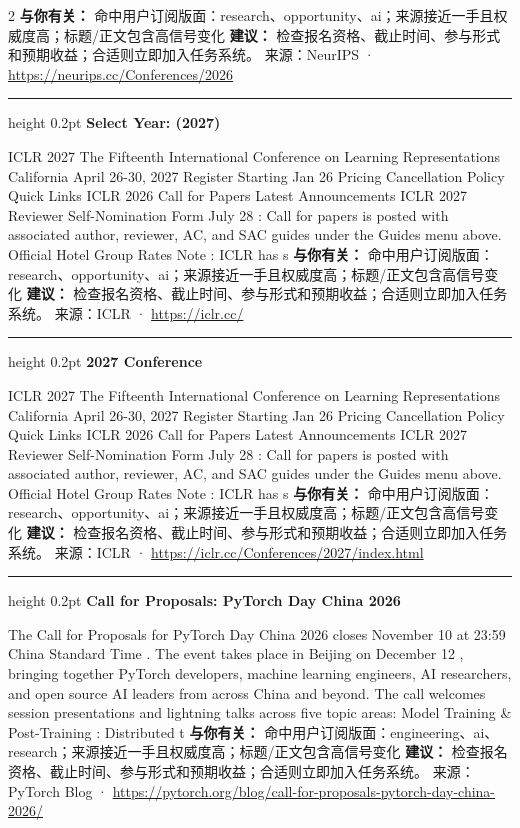 \documentclass[10.5pt]{ctexart}
\begin{document}
\begin{multicols}{2}
\textbf{与你有关：} 命中用户订阅版面：research、opportunity、ai；来源接近一手且权威度高；标题/正文包含高信号变化
\textbf{建议：} 检查报名资格、截止时间、参与形式和预期收益；合适则立即加入任务系统。
{\footnotesize\color{ormuted} 来源：NeurIPS · \url{https://neurips.cc/Conferences/2026}}
\vspace{2mm}
\hrule height 0.2pt
\vspace{2mm}
{\large\bfseries Select Year: (2027)}\par
ICLR 2027 The Fifteenth International Conference on Learning Representations California April 26-30, 2027 Register Starting Jan 26 Pricing Cancellation Policy Quick Links ICLR 2026 Call for Papers Latest Announcements ICLR 2027 Reviewer Self-Nomination Form July 28 : Call for papers is posted with associated author, reviewer, AC, and SAC guides under the Guides menu above. Official Hotel Group Rates Note : ICLR has s
\textbf{与你有关：} 命中用户订阅版面：research、opportunity、ai；来源接近一手且权威度高；标题/正文包含高信号变化
\textbf{建议：} 检查报名资格、截止时间、参与形式和预期收益；合适则立即加入任务系统。
{\footnotesize\color{ormuted} 来源：ICLR · \url{https://iclr.cc/}}
\vspace{2mm}
\hrule height 0.2pt
\vspace{2mm}
{\large\bfseries 2027 Conference}\par
ICLR 2027 The Fifteenth International Conference on Learning Representations California April 26-30, 2027 Register Starting Jan 26 Pricing Cancellation Policy Quick Links ICLR 2026 Call for Papers Latest Announcements ICLR 2027 Reviewer Self-Nomination Form July 28 : Call for papers is posted with associated author, reviewer, AC, and SAC guides under the Guides menu above. Official Hotel Group Rates Note : ICLR has s
\textbf{与你有关：} 命中用户订阅版面：research、opportunity、ai；来源接近一手且权威度高；标题/正文包含高信号变化
\textbf{建议：} 检查报名资格、截止时间、参与形式和预期收益；合适则立即加入任务系统。
{\footnotesize\color{ormuted} 来源：ICLR · \url{https://iclr.cc/Conferences/2027/index.html}}
\vspace{2mm}
\hrule height 0.2pt
\vspace{2mm}
{\large\bfseries Call for Proposals: PyTorch Day China 2026}\par
The Call for Proposals for PyTorch Day China 2026 closes November 10 at 23:59 China Standard Time . The event takes place in Beijing on December 12 , bringing together PyTorch developers, machine learning engineers, AI researchers, and open source AI leaders from across China and beyond. The call welcomes session presentations and lightning talks across five topic areas: Model Training \& Post-Training : Distributed t
\textbf{与你有关：} 命中用户订阅版面：engineering、ai、research；来源接近一手且权威度高；标题/正文包含高信号变化
\textbf{建议：} 检查报名资格、截止时间、参与形式和预期收益；合适则立即加入任务系统。
{\footnotesize\color{ormuted} 来源：PyTorch Blog · \url{https://pytorch.org/blog/call-for-proposals-pytorch-day-china-2026/}}
\end{multicols}
\end{document}
